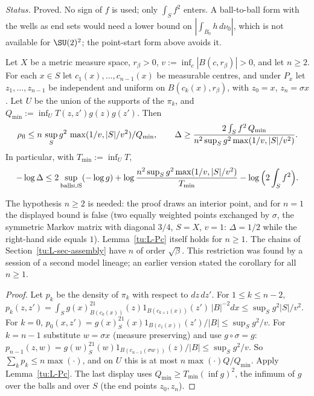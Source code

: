 \noindent\emph{Status.} Proved. No sign of $f$ is used; only $\int_Sf^2$ enters. A ball-to-ball
form with the wells as end sets would need a lower bound on $|\int_{B_0}h\,d\nu_0|$, which is not
available for $\SU(2)^2$; the point-start form above avoids it.

\begin{corollary}\label{tu:L-B}
Let $X$ be a metric measure space, $r_\beta>0$, $v:=\inf_c|B(c,r_\beta)|>0$, and let $n\ge2$. For each $x\in S$ let
$c_1(x),\dots,c_{n-1}(x)$ be measurable centres, and under $P_x$ let $z_1,\dots,z_{n-1}$ be
independent and uniform on $B(c_k(x),r_\beta)$, with $z_0=x$, $z_n=\sigma x$. Let $U$ be the union
of the supports of the $\pi_k$, and $Q_{\min}:=\inf_U T(z,z')g(z)g(z')$. Then
\[
\rho_{\rm fl}\le n\,\sup_S g^2\,\max(1/v,|S|/v^2)/Q_{\min},\qquad
\Delta\ge\frac{2\int_Sf^2\,Q_{\min}}{n^2\sup_Sg^2\max(1/v,|S|/v^2)} .
\]
In particular, with $T_{\min}:=\inf_UT$,
\[
-\log\Delta\le 2\sup_{\rm balls\cup S}(-\log g)+\log\frac{n^2\sup_Sg^2\max(1/v,|S|/v^2)}{T_{\min}}-\log\Big(2\int_Sf^2\Big).
\]
\end{corollary}

\begin{remark}\label{tu:L-B-n}
The hypothesis $n\ge2$ is needed: the proof draws an interior point, and for $n=1$ the displayed bound is false
(two equally weighted points exchanged by $\sigma$, the symmetric Markov matrix with diagonal $3/4$, $S=X$, $v=1$: $\Delta=1/2$
while the right-hand side equals $1$). Lemma~\ref{tu:L-Pc} itself holds for $n\ge1$. The chains of Section~\ref{tu:L-sec-assembly} have
$n$ of order $\sqrt\beta$. This restriction was found by a session of a second model lineage; an earlier version stated the
corollary for all $n\ge1$.
\end{remark}

\begin{proof}
Let $p_k$ be the density of $\pi_k$ with respect to $dz\,dz'$. For $1\le k\le n-2$,
$p_k(z,z')=\int_Sg(x)^21_{B(c_k(x))}(z)1_{B(c_{k+1}(x))}(z')\,|B|^{-2}dx\le\sup_Sg^2|S|/v^2$.
For $k=0$, $p_0(x,z')=g(x)^21_S(x)1_{B(c_1(x))}(z')/|B|\le\sup_Sg^2/v$. For $k=n-1$ substitute
$w=\sigma x$ (measure preserving) and use $g\circ\sigma=g$:
$p_{n-1}(z,w)=g(w)^21_S(w)1_{B(c_{n-1}(\sigma w))}(z)/|B|\le\sup_Sg^2/v$. So
$\sum_kp_k\le n\max(\cdot)$, and on $U$ this is at most $n\max(\cdot)Q/Q_{\min}$. Apply
Lemma~\ref{tu:L-Pc}. The last display uses $Q_{\min}\ge T_{\min}(\inf g)^2$, the infimum of $g$ over
the balls and over $S$ (the end points $z_0,z_n$).
\end{proof}

